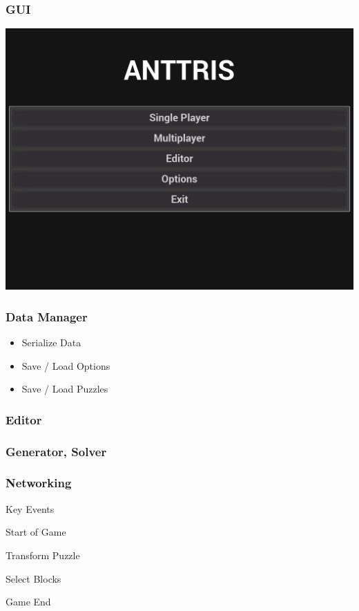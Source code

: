 \documentclass{beamer}
\begin{document}
\begin{frame}
    \frametitle{GUI} %
    \includegraphics[width=1\linewidth]{Anttris_MainMenu.png}
\end{frame}

\begin{frame}
    \frametitle{Data Manager} %
    \begin{itemize}
	\item Serialize Data
	\pause \item Save / Load Options
	\pause \item Save / Load Puzzles
	\end{itemize}
\end{frame}

\begin{frame}
    \frametitle{Editor} %
\end{frame}

\begin{frame}
    \frametitle{Generator, Solver} %
\end{frame}

\begin{frame}
    \frametitle{Networking} %
        \pause \item Key Events
            \pause \item Start of Game
            \pause \item Transform Puzzle
            \pause \item Select Blocks
            \pause \item Game End
\end{frame}
\end{document}
